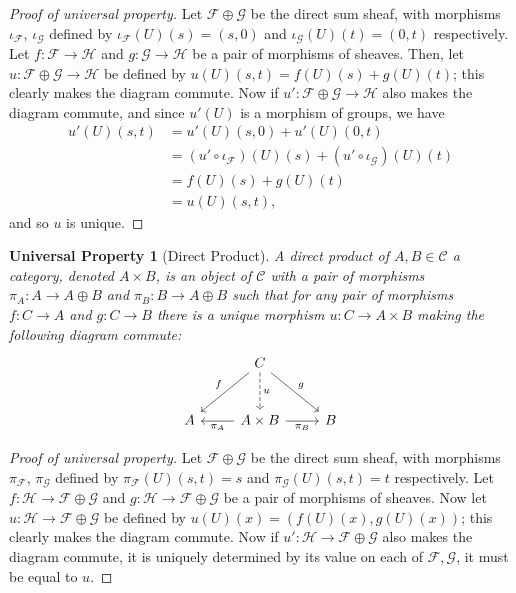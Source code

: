 \documentclass[12pt,letterpaper]{article}
\newtheorem*{universalproperty}{Universal Property}
\theoremstyle{definition}
\theoremstyle{remark}
\numberwithin{equation}{section}
\numberwithin{figure}{problem}
\begin{document}
\begin{proof}[Proof of universal property]
  Let $\mathscr{F} \oplus \mathscr{G}$ be the direct sum sheaf, with morphisms $\iota_\mathscr{F}$, $\iota_\mathscr{G}$ defined by $\iota_{\mathscr{F}}(U)(s) = (s,0)$ and $\iota_{\mathscr{G}}(U)(t) = (0,t)$ respectively. Let $f\colon \mathscr{F} \to \mathscr{H}$ and $g\colon \mathscr{G} \to \mathscr{H}$ be a pair of morphisms of sheaves. Then, let $u\colon\mathscr{F}\oplus\mathscr{G} \to \mathscr{H}$ be defined by $u(U)(s,t) = f(U)(s) + g(U)(t)$; this clearly makes the diagram commute. Now if $u'\colon\mathscr{F}\oplus\mathscr{G} \to \mathscr{H}$ also makes the diagram commute, and since $u'(U)$ is a morphism of groups, we have
  \begin{align*}
    u'(U)(s,t) &= u'(U)(s,0) + u'(U)(0,t)\\
    &= (u' \circ \iota_\mathscr{F})(U)(s) + (u' \circ \iota_\mathscr{G})(U)(t)\\
    &= f(U)(s) + g(U)(t)\\
    &= u(U)(s,t),
  \end{align*}
  and so $u$ is unique.
\end{proof}
\begin{universalproperty}[Direct Product]
  A \emph{direct product} of $A,B \in \mathscr{C}$ a category, denoted $A \times B$, is an object of $\mathscr{C}$ with a pair of morphisms $\pi_A\colon A \to A \oplus B$ and $\pi_B\colon B \to A \oplus B$ such that for any pair of morphisms $f\colon C \to A$ and $g\colon C \to B$ there is a unique morphism $u \colon C \to A \times B$ making the following diagram commute:
  \begin{equation*}
    \begin{tikzcd}[row sep=large]
      & C\arrow{dl}[swap]{f}\arrow{dr}{g}\dar[dashed]{u}\\
      A & A \times B \lar{\pi_A} \rar[swap]{\pi_B} & B
    \end{tikzcd}
  \end{equation*}
\end{universalproperty}
\begin{proof}[Proof of universal property]
  Let $\mathscr{F} \oplus \mathscr{G}$ be the direct sum sheaf, with morphisms $\pi_\mathscr{F}$, $\pi_\mathscr{G}$ defined by $\pi_{\mathscr{F}}(U)(s,t) = s$ and $\pi_{\mathscr{G}}(U)(s,t) = t$ respectively. Let $f\colon \mathscr{H} \to \mathscr{F} \oplus \mathscr{G}$ and $g\colon \mathscr{H} \to \mathscr{F} \oplus \mathscr{G}$ be a pair of morphisms of sheaves. Now let $u\colon\mathscr{H} \to \mathscr{F} \oplus \mathscr{G}$ be defined by $u(U)(x) = (f(U)(x),g(U)(x))$; this clearly makes the diagram commute. Now if $u'\colon \mathscr{H} \to \mathscr{F} \oplus \mathscr{G}$ also makes the diagram commute, it is uniquely determined by its value on each of $\mathscr{F},\mathscr{G}$, it must be equal to $u$.
\end{proof}
\end{document}
